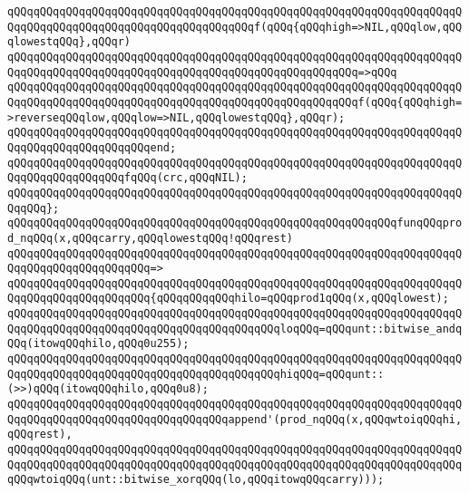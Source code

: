 \newline
\verb|qQQqqQQqqQQqqQQqqQQqqQQqqQQqqQQqqQQqqQQqqQQqqQQqqQQqqQQqqQQqqQQqqQQqqQQqqQQqqQQqqQQqqQQqqQQqqQQqqQQqqQQqqQQqf(qQQq{qQQqhigh=>NIL,qQQqlow,qQQqlowestqQQq},qQQqr)|\newline
\verb|qQQqqQQqqQQqqQQqqQQqqQQqqQQqqQQqqQQqqQQqqQQqqQQqqQQqqQQqqQQqqQQqqQQqqQQqqQQqqQQqqQQqqQQqqQQqqQQqqQQqqQQqqQQqqQQqqQQqqQQqqQQq=>qQQq|\newline
\verb|qQQqqQQqqQQqqQQqqQQqqQQqqQQqqQQqqQQqqQQqqQQqqQQqqQQqqQQqqQQqqQQqqQQqqQQqqQQqqQQqqQQqqQQqqQQqqQQqqQQqqQQqqQQqqQQqqQQqqQQqqQQqf(qQQq{qQQqhigh=>reverseqQQqlow,qQQqlow=>NIL,qQQqlowestqQQq},qQQqr);|\newline
\verb|qQQqqQQqqQQqqQQqqQQqqQQqqQQqqQQqqQQqqQQqqQQqqQQqqQQqqQQqqQQqqQQqqQQqqQQqqQQqqQQqqQQqqQQqqQQqend;|\newline
\newline
\verb|qQQqqQQqqQQqqQQqqQQqqQQqqQQqqQQqqQQqqQQqqQQqqQQqqQQqqQQqqQQqqQQqqQQqqQQqqQQqqQQqqQQqqQQqfqQQq(crc,qQQqNIL);|\newline
\verb|qQQqqQQqqQQqqQQqqQQqqQQqqQQqqQQqqQQqqQQqqQQqqQQqqQQqqQQqqQQqqQQqqQQqqQQqqQQq};|\newline
\newline
\verb|qQQqqQQqqQQqqQQqqQQqqQQqqQQqqQQqqQQqqQQqqQQqqQQqqQQqqQQqqQQqfunqQQqprod_nqQQq(x,qQQqcarry,qQQqlowestqQQq!qQQqrest)|\newline
\verb|qQQqqQQqqQQqqQQqqQQqqQQqqQQqqQQqqQQqqQQqqQQqqQQqqQQqqQQqqQQqqQQqqQQqqQQqqQQqqQQqqQQqqQQqqQQq=>|\newline
\verb|qQQqqQQqqQQqqQQqqQQqqQQqqQQqqQQqqQQqqQQqqQQqqQQqqQQqqQQqqQQqqQQqqQQqqQQqqQQqqQQqqQQqqQQqqQQq{qQQqqQQqqQQqhilo=qQQqprod1qQQq(x,qQQqlowest);|\newline
\verb|qQQqqQQqqQQqqQQqqQQqqQQqqQQqqQQqqQQqqQQqqQQqqQQqqQQqqQQqqQQqqQQqqQQqqQQqqQQqqQQqqQQqqQQqqQQqqQQqqQQqqQQqqQQqqQQqloqQQq=qQQqunt::bitwise_andqQQq(itowqQQqhilo,qQQq0u255);|\newline
\verb|qQQqqQQqqQQqqQQqqQQqqQQqqQQqqQQqqQQqqQQqqQQqqQQqqQQqqQQqqQQqqQQqqQQqqQQqqQQqqQQqqQQqqQQqqQQqqQQqqQQqqQQqqQQqqQQqhiqQQq=qQQqunt::(>>)qQQq(itowqQQqhilo,qQQq0u8);|\newline
\verb|qQQqqQQqqQQqqQQqqQQqqQQqqQQqqQQqqQQqqQQqqQQqqQQqqQQqqQQqqQQqqQQqqQQqqQQqqQQqqQQqqQQqqQQqqQQqqQQqqQQqqQQqappend'(prod_nqQQq(x,qQQqwtoiqQQqhi,qQQqrest),|\newline
\verb|qQQqqQQqqQQqqQQqqQQqqQQqqQQqqQQqqQQqqQQqqQQqqQQqqQQqqQQqqQQqqQQqqQQqqQQqqQQqqQQqqQQqqQQqqQQqqQQqqQQqqQQqqQQqqQQqqQQqqQQqqQQqqQQqqQQqqQQqqQQqqQQqwtoiqQQq(unt::bitwise_xorqQQq(lo,qQQqitowqQQqcarry)));|\newline
